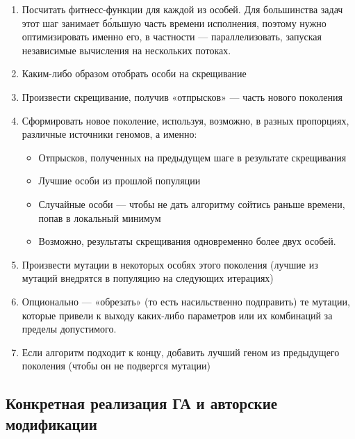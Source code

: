 \begin{enumerate}
    \item Посчитать фитнесс-функции для каждой из особей.
    Для большинства задач этот шаг занимает бо́льшую часть времени исполнения, поэтому нужно оптимизировать именно его, в частности — параллелизовать, запуская независимые вычисления на нескольких потоках.

    \item Каким-либо образом отобрать особи на скрещивание

    \item Произвести скрещивание, получив «отпрысков» — часть нового поколения

    \item Сформировать новое поколение, используя, возможно, в разных пропорциях, различные источники геномов, а именно:

    \begin{itemize}

        \item Отпрысков, полученных на предыдущем шаге в результате скрещивания
        \item Лучшие особи из прошлой популяции

        \item Случайные особи —  чтобы не дать алгоритму сойтись раньше времени, попав в локальный минимум

        \item Возможно, результаты скрещивания одновременно более двух особей.

    \end{itemize}

    \item Произвести мутации в некоторых особях этого поколения (лучшие из мутаций внедрятся в популяцию на следующих итерациях)

    \item Опционально — «обрезать» (то есть насильственно подправить)
    те мутации, которые привели к выходу каких-либо параметров или их комбинаций за пределы допустимого.

    \item Если алгоритм подходит к концу, добавить лучший геном из предыдущего поколения (чтобы он не подвергся мутации)

\end{enumerate}

\subsection{Конкретная реализация ГА и авторские модификации}\label{subsec:my_modifications}

